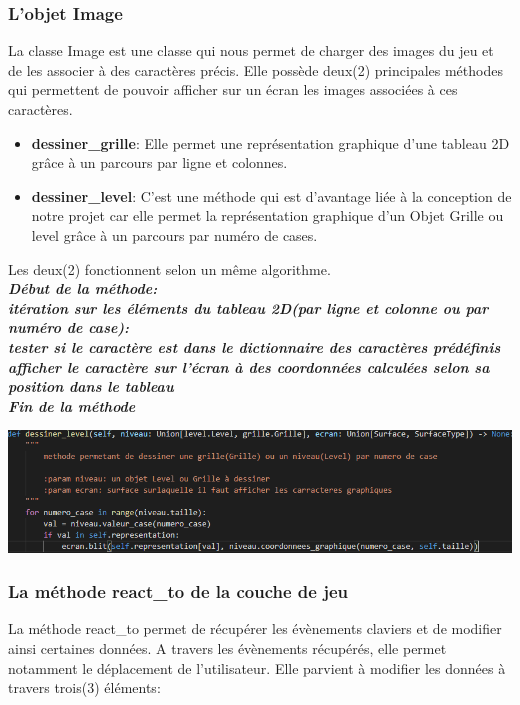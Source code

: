 \documentclass[a4paper,12pt]{article} %
\begin{document}
\subsubsection{L'objet Image}
La classe Image est une classe qui nous permet de charger des images du jeu et de les associer à des caractères précis.
Elle possède deux(2) principales méthodes qui permettent de pouvoir afficher sur un écran les images associées à ces caractères.
\begin{itemize}
	\item \textbf{dessiner\_grille}: Elle permet une représentation graphique d'une tableau 2D grâce à un parcours par ligne et colonnes.
	\item \textbf{dessiner\_level}: C'est une méthode qui est d'avantage liée à la conception de notre projet car elle permet la représentation graphique d'un Objet Grille ou level grâce à un parcours par numéro de cases.
\end{itemize}
Les deux(2) fonctionnent selon un même algorithme.
\\
\textbf{\emph{Début de la méthode:
\\
\tabto{2em}itération sur les éléments du tableau 2D(par ligne et colonne ou par numéro de case):
\\
\tabto{3em} tester si le caractère est dans le dictionnaire des caractères prédéfinis
\\
\tabto{4em} afficher le caractère sur l'écran à des coordonnées calculées selon sa position dans le tableau
\\	
Fin de la méthode}}
\\
\begin{center}
	\includegraphics[scale=0.6]{images/Capture_121210.png}
\end{center}

\newpage
\subsubsection{La méthode react\_to de la couche de jeu}

La méthode react\_to permet de récupérer les évènements claviers et de modifier ainsi certaines données. A travers les évènements récupérés, elle permet notamment le déplacement de l'utilisateur. Elle parvient à modifier les données à travers trois(3) éléments:
\end{document}

